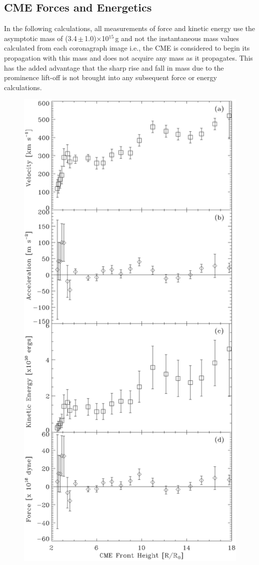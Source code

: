 \documentclass{emulateapj}
\begin{document}
\subsection{CME Forces and Energetics}

In the following calculations, all measurements of force and kinetic energy use the asymptotic mass of (3.4\,$\pm$\,1.0)$\times$10$^{15}$\,g and not the instantaneous mass values calculated from each coronagraph image i.e., the CME is considered to begin its propagation with this mass and does not acquire any mass as it propagates. This has the added advantage that the sharp rise and fall in mass due to the prominence lift-off is not brought into any subsequent force or energy calculations. 

\begin{figure}[h!]
\includegraphics[scale=0.75, angle=0]{20081212_force.eps}

\end{figure}
\end{document}
